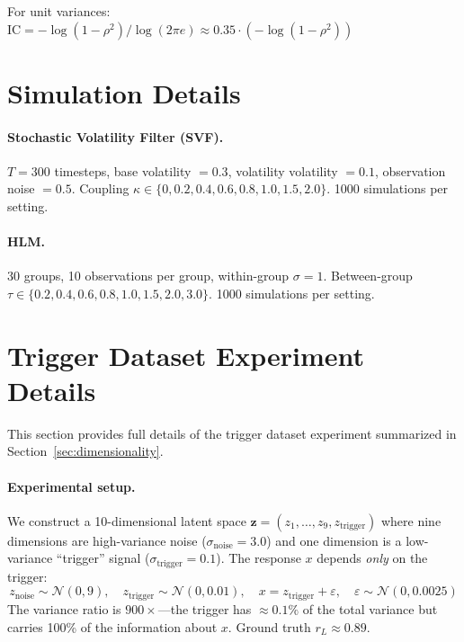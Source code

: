 \documentclass[10pt]{article} %
\theoremstyle{plain}
\theoremstyle{definition}
\newcommand{\IC}{\mathrm{IC}}  %
\begin{document}
For unit variances: $\IC = -\log(1-\rho^2) / \log(2\pi e) \approx 0.35 \cdot (-\log(1-\rho^2))$

\section{Simulation Details}
\label{app:simulations}

\paragraph{Stochastic Volatility Filter (SVF).} $T = 300$ timesteps, base volatility $= 0.3$, volatility volatility $= 0.1$, observation noise $= 0.5$. Coupling $\kappa \in \{0, 0.2, 0.4, 0.6, 0.8, 1.0, 1.5, 2.0\}$. 1000 simulations per setting.

\paragraph{HLM.} 30 groups, 10 observations per group, within-group $\sigma = 1$. Between-group $\tau \in \{0.2, 0.4, 0.6, 0.8, 1.0, 1.5, 2.0, 3.0\}$. 1000 simulations per setting.

\section{Trigger Dataset Experiment Details}
\label{app:trigger}

This section provides full details of the trigger dataset experiment summarized in Section~\ref{sec:dimensionality}.

\paragraph{Experimental setup.} We construct a 10-dimensional latent space $\mathbf{z} = (z_1, \ldots, z_9, z_{\text{trigger}})$ where nine dimensions are high-variance noise ($\sigma_{\text{noise}} = 3.0$) and one dimension is a low-variance ``trigger'' signal ($\sigma_{\text{trigger}} = 0.1$). The response $x$ depends \emph{only} on the trigger:
\begin{equation}
z_{\text{noise}} \sim \mathcal{N}(0, 9), \quad z_{\text{trigger}} \sim \mathcal{N}(0, 0.01), \quad x = z_{\text{trigger}} + \varepsilon, \quad \varepsilon \sim \mathcal{N}(0, 0.0025)
\end{equation}
The variance ratio is $900\times$---the trigger has $\approx 0.1\%$ of the total variance but carries 100\% of the information about $x$. Ground truth $r_L \approx 0.89$.
\end{document}
